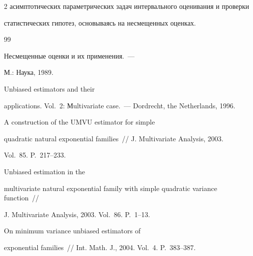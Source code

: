 \begin{multicols}{2}
   асимптотических параметрических задач интервального оценивания и проверки


  статистических гипотез, основываясь на несмещенных оценках.


  


{\small\frenchspacing


{%




\begin{thebibliography}{99}    









Несмещенные оценки и их применения.~---


 М.: Наука, 1989.








Unbiased estimators and their


applications. Vol.~2: Мultivariate case.~---  Dordrecht, the Netherlands, 1996.








A construction of the UMVU estimator for simple


quadratic natural exponential families~// J. Multivariate Analysis, 2003.


Vol.~85. P.~217--233.








Unbiased estimation in the


 multivariate natural exponential family with simple quadratic variance function~//


 J. Multivariate Analysis, 2003. Vol.~86. P.~1--13.








On minimum variance unbiased estimators of


exponential families~// Int. Math. J., 2004. Vol.~4. P.~383--387.



\end{thebibliography}}}
\end{multicols}
